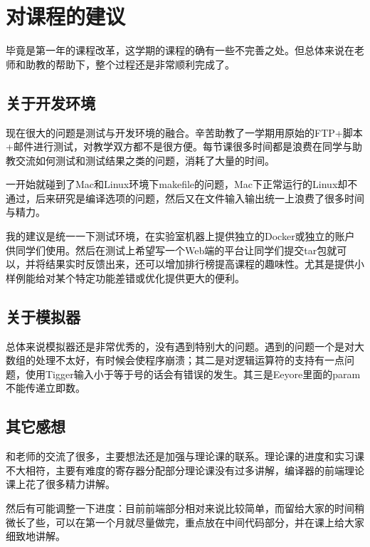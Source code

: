 \documentclass{ctexart}
\begin{document}
\section{对课程的建议}
毕竟是第一年的课程改革，这学期的课程的确有一些不完善之处。但总体来说在老师和助教的帮助下，整个过程还是非常顺利完成了。

\subsection{关于开发环境}
现在很大的问题是测试与开发环境的融合。辛苦助教了一学期用原始的FTP+脚本+邮件进行测试，对教学双方都不是很方便。每节课很多时间都是浪费在同学与助教交流如何测试和测试结果之类的问题，消耗了大量的时间。

一开始就碰到了Mac和Linux环境下makefile的问题，Mac下正常运行的Linux却不通过，后来研究是编译选项的问题，然后又在文件输入输出统一上浪费了很多时间与精力。

我的建议是统一一下测试环境，在实验室机器上提供独立的Docker或独立的账户供同学们使用。然后在测试上希望写一个Web端的平台让同学们提交tar包就可以，并将结果实时反馈出来，还可以增加排行榜提高课程的趣味性。尤其是提供小样例能给对某个特定功能差错或优化提供更大的便利。

\subsection{关于模拟器}
总体来说模拟器还是非常优秀的，没有遇到特别大的问题。遇到的问题一个是对大数组的处理不太好，有时候会使程序崩溃；其二是对逻辑运算符的支持有一点问题，使用Tigger输入小于等于号的话会有错误的发生。其三是Eeyore里面的param不能传递立即数。

\subsection{其它感想}
和老师的交流了很多，主要想法还是加强与理论课的联系。理论课的进度和实习课不大相符，主要有难度的寄存器分配部分理论课没有过多讲解，编译器的前端理论课上花了很多精力讲解。

然后有可能调整一下进度：目前前端部分相对来说比较简单，而留给大家的时间稍微长了些，可以在第一个月就尽量做完，重点放在中间代码部分，并在课上给大家细致地讲解。
\end{document}
